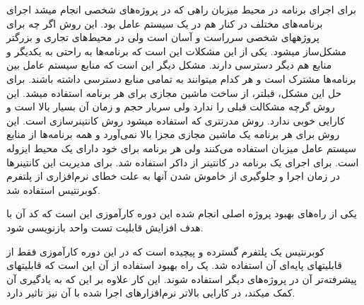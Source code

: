\documentclass[a4]{report}
\begin{document}
برای اجرای برنامه در محیط میزبان راهی که در پروژه‌های شخصی انجام میشد اجرای برنامه‌های مختلف در
کنار هم در یک سیستم عامل بود. این روش اگر چه برای پروژههای شخصی سرراست و آسان است ولی در
محیط‌های تجاری و بزرگتر مشکل‌ساز میشود. یکی از این مشکلات این است که برنامه‌ها به راحتی به یکدیگر و
منابع هم دیگر دسترسی دارند. مشکل دیگر این است که منابع سیستم عامل بین برنامه‌ها مشترک است و هر
کدام میتوانند به تمامی منابع دسترسی داشته باشند. برای حل این مشکل، قبلتر، از ساخت ماشین مجازی برای
هر برنامه استفاده میشد. این روش گرچه مشکالت قبلی را ندارد ولی سربار حجم و زمان آن بسیار بالا است و
کارایی خوبی ندارد. روش مدرنتری که استفاده میشود روش کانتینرسازی است. این روش برای هر برنامه یک
ماشین مجازی مجزا بالا نمی‌آورد و همه برنامه‌ها از منابع سیستم عامل میزبان استفاده می‌کنند ولی هر برنامه
برای خود دارای یک محیط ایزوله است. برای اجرای یک برنامه در کانتینر از داکر استفاده شد. برای مدیریت این
کانتینرها در زمان اجرا و جلوگیری از خاموش شدن آنها به علت خطای نرم‌افزاری از پلتفرم کوبرنتیس استفاده
شد.

یکی از راه‌های بهبود پروژه اصلی انجام شده این دوره کارآموزی این است که کد آن با هدف افزایش قابلیت
تست واحد بازنویسی شود.

کوبرنتیس یک پلتفرم گسترده و پیچیده است که در این دوره کارآموزی فقط از قابلیتهای پایه‌ای آن استفاده
شد. یک راه بهبود استفاده از آن این است که قابلیتهای پیشرفته‌تر آن در پروژه‌های دیگر استفاده شوند. این کار
علاوه بر این که به یادگیری آن کمک میکند، در کارایی بالاتر نرم‌افزارهای اجرا شده با آن نیز تاثیر دارد.
\end{document}
